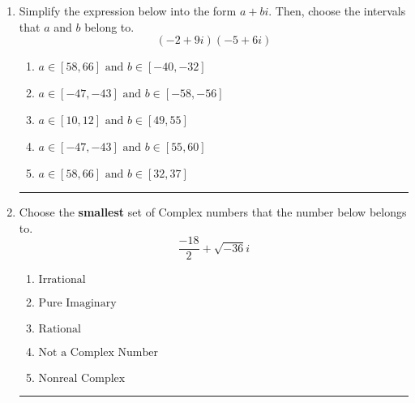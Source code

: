 \documentclass[14pt]{extbook}
\newcommand{\litem}[1]{\item#1\hspace*{-1cm}\rule{\textwidth}{0.4pt}}
\begin{document}
\begin{enumerate}
{\begin{enumerate}[label=\Alph*.]
\end{enumerate} }
\litem{
Simplify the expression below into the form $a+bi$. Then, choose the intervals that $a$ and $b$ belong to.\[ (-2 + 9 i)(-5 + 6 i) \]\begin{enumerate}[label=\Alph*.]
\item \( a \in [58, 66] \text{ and } b \in [-40, -32] \)
\item \( a \in [-47, -43] \text{ and } b \in [-58, -56] \)
\item \( a \in [10, 12] \text{ and } b \in [49, 55] \)
\item \( a \in [-47, -43] \text{ and } b \in [55, 60] \)
\item \( a \in [58, 66] \text{ and } b \in [32, 37] \)

\end{enumerate} }
\litem{
Choose the \textbf{smallest} set of Complex numbers that the number below belongs to.\[ \frac{-18}{2}+\sqrt{-36}i \]\begin{enumerate}[label=\Alph*.]
\item \( \text{Irrational} \)
\item \( \text{Pure Imaginary} \)
\item \( \text{Rational} \)
\item \( \text{Not a Complex Number} \)
\item \( \text{Nonreal Complex} \)

\end{enumerate} }
\end{enumerate}
\end{document}
